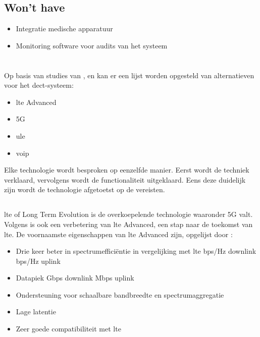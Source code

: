 \subsection{Won't have}
\label{sec:Wont-have}

\begin{itemize}
  \item Integratie medische apparatuur
  \item Monitoring software voor audits van het systeem
\end{itemize}

\section{}%
\label{sec:andere}%

Op basis van studies van \textcite{Montalvo2024}, \textcite{Kranz2010} en \textcite{Soenmez2018} kan er een lijst worden opgesteld van alternatieven voor het \gls{dect}-systeem:

\begin{itemize}
  \item \gls{lte} Advanced
  \item 5G
  \item \gls{ule}
  \item \gls{voip}
\end{itemize}

Elke technologie wordt besproken op eenzelfde manier. Eerst wordt de techniek verklaard, vervolgens wordt de functionaliteit uitgeklaard. Eens deze duidelijk zijn wordt de technologie afgetoetst op de vereisten.

\subsection{}%
\label{sec:ltea}%

\gls{lte} of Long Term Evolution is de overkoepelende technologie waaronder 5G valt. Volgens \textcite{Bakare2022} is ook een verbetering van \gls{lte} Advanced, een stap naar de toekomst van \gls{lte}. De voornaamste eigenschappen van \gls{lte} Advanced zijn, opgelijst door \textcite{Bakare2022}:

\begin{itemize}
  \item Drie keer beter in spectrumefficiëntie in vergelijking met \gls{lte}
   bps/Hz downlink
   bps/Hz uplink
  \item Datapiek 
   Gbps downlink
   Mbps uplink
  \item Ondersteuning voor schaalbare bandbreedte en spectrumaggregatie
  \item Lage latentie
  \item Zeer goede compatibiliteit met \gls{lte}
\end{itemize}

